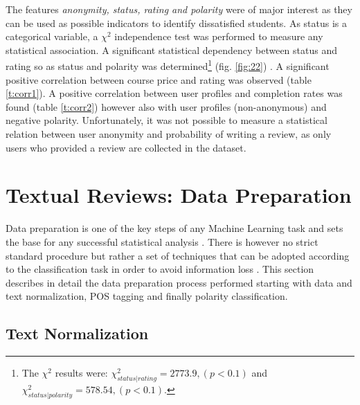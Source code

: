 \documentclass[
	a4paper,
	pdftex,
	12pt,	
	footinclude=true,
	fleqn,
	final,
	]{report}%
\begin{document}
The features \emph{anonymity, status, rating and polarity} were of major 
interest as they can be used as possible indicators to identify 
dissatisfied students. As status is a categorical variable, 
a $\chi^{2}$ independence test was performed to measure any statistical 
association. A significant statistical dependency between status 
and rating so as status and polarity was determined\footnote{
The $\chi^{2}$ results were: 
$\chi^{2}_{status|rating} = 2773.9, (p < 0.1)$ and 
$\chi^{2}_{status|polarity} = 578.54, (p < 0.1)$.} (fig. \ref{fig:22})
. A significant positive correlation between course price 
and rating was observed (table \ref{t:corr1}). A positive correlation 
between user profiles and completion rates was found (table \ref{t:corr2}) 
however also with user profiles (non-anonymous) and negative polarity.
Unfortunately, it was not possible to measure a statistical relation 
between user anonymity and probability of writing a review, as only 
users who provided a review are collected in the dataset. 


\vspace{-0.45cm}
\section{Textual Reviews: Data Preparation} 
\label{sec:preprocess}
\vspace{-0.3cm}
Data preparation is one of the key steps of any Machine Learning task 
and sets the base for any successful statistical analysis \cite{Shapiro1996}. 
There is however no strict standard procedure but rather a set of techniques 
that can be adopted according to the classification task in order to avoid
information loss \cite{Manning1999}. This section describes in detail the 
data preparation process performed starting with data and 
text normalization, POS tagging and finally polarity classification.

\vspace{-0.45cm}
\subsection{Text Normalization}
\label{sec:text_normalization}
\vspace{-0.3cm}
\end{document}
